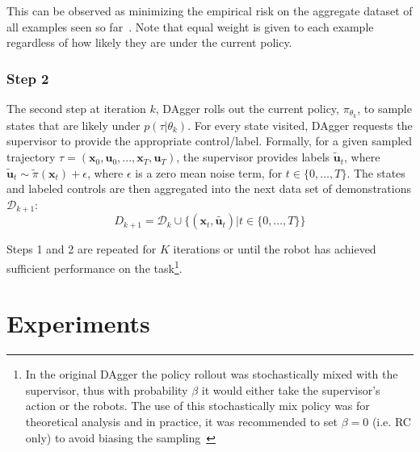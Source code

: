 \documentclass[10pt, conference]{ieeeconf}      %
\newcommand{\bu}{\mathbf{u}}
\newcommand{\bx}{\mathbf{x}}
\begin{document}
This can be observed as minimizing the empirical risk on the aggregate dataset of all examples seen so far~\cite{scholkopf2002learning}.  Note that equal weight is given to each example regardless of how likely they are under the current policy.
 

 \subsubsection{Step 2}
The second step at iteration $k$, DAgger rolls out the current policy, $\pi_{\theta_{k}}$, to sample states that are likely under $p(\tau|\theta_{k})$.  For every state visited, DAgger requests the supervisor to provide the appropriate control/label. Formally, for a given sampled trajectory  $\tau = (\bx_0,\bu_0,...,\bx_T,\bu_T )$, the supervisor provides labels $\tilde{\bu}_t$, where $\tilde{\bu}_t \sim \tilde{\pi}(\bx_t) + \epsilon$, where $\epsilon$ is a  zero mean noise term, for $t\in \{0, \ldots, T\}$.
The states and labeled controls are then aggregated into the next data set of demonstrations $\mathcal{D}_{k+1}$:
$$D_{k+1}=\mathcal{D}_k \cup \{(\bx_t,\tilde{\bu_t})|t\in\{0,\ldots,T\}\} $$

Steps 1 and 2 are repeated for $K$ iterations or until the robot has achieved sufficient performance on the
task\footnote{In the original DAgger the policy rollout was stochastically mixed with the supervisor, thus with
    probability $\beta$ it would either take the supervisor's action or the robots. The use of this stochastically mix
    policy was for theoretical analysis and in practice, it was recommended to set $\beta = 0$ (i.e. RC only) to avoid biasing the
sampling~\cite{NIPS2014_5421,ross2010reduction}}.


 


\section{Experiments}
\end{document}
